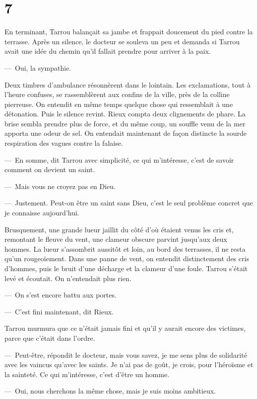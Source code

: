 \documentclass[french,twoside]{book} %
\begin{document}
\section[{7}]{7}
\noindent En terminant, Tarrou balançait sa jambe et frappait doucement du pied contre la terrasse. Après un silence, le docteur se souleva un peu et demanda si Tarrou avait une idée du chemin qu’il fallait prendre pour arriver à la paix.\par
— Oui, la sympathie.\par
Deux timbres d’ambulance résonnèrent dans le lointain. Les exclamations, tout à l’heure confuses, se rassemblèrent aux confins de la ville, près de la colline pierreuse. On entendit en même temps quelque chose qui ressemblait à une détonation. Puis le silence revint. Rieux compta deux clignements de phare. La brise sembla prendre plus de force, et du même coup, un souffle venu de la mer apporta une odeur de sel. On entendait maintenant de façon distincte la sourde respiration des vagues contre la falaise.\par
— En somme, dit Tarrou avec simplicité, ce qui m’intéresse, c’est de savoir comment on devient un saint.\par
— Mais vous ne croyez pas en Dieu.\par
— Justement. Peut-on être un saint sans Dieu, c’est le seul problème concret que je connaisse aujourd’hui.\par
Brusquement, une grande lueur jaillit du côté d’où étaient venus les cris et, remontant le fleuve du vent, une clameur obscure parvint jusqu’aux deux hommes. La lueur s’assombrit aussitôt et loin, au bord des terrasses, il ne resta qu’un rougeoiement. Dans une panne de vent, on entendit distinctement des cris d’hommes, puis le bruit d’une décharge et la clameur d’une foule. Tarrou s’était levé et écoutait. On n’entendait plus rien.\par
— On s’est encore battu aux portes.\par
— C’est fini maintenant, dit Rieux.\par
Tarrou murmura que ce n’était jamais fini et qu’il y aurait encore des victimes, parce que c’était dans l’ordre.\par
— Peut-être, répondit le docteur, mais vous savez, je me sens plus de solidarité avec les vaincus qu’avec les saints. Je n’ai pas de goût, je crois, pour l’héroïsme et la sainteté. Ce qui m’intéresse, c’est d’être un homme.\par
— Oui, nous cherchons la même chose, mais je suis moins ambitieux.\par
\end{document}
